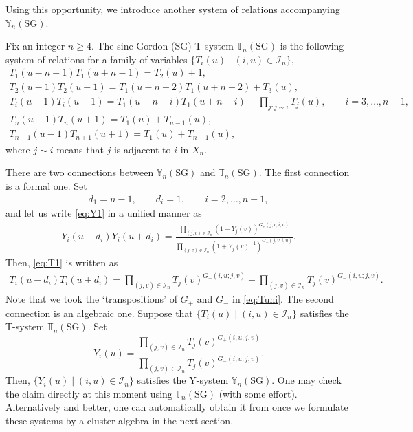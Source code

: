 Using this opportunity, we introduce
another system of relations
 accompanying  $\mathbb{Y}_{n}(\mathrm{SG})$.
\begin{Definition}
Fix an integer $n \geq 4$.
The sine-Gordon (SG)
T-system $\mathbb{T}_{n}(\mathrm{SG})$
is the following system of relations for
a family of variables
 $\{T_i(u) \mid (i,u)\in \mathcal{I}_n \}$,
\begin{gather}
T_1\left(u-n+1\right)
T_1\left(u+n-1\right)
=
T_2(u)+1,\nonumber\\
T_2(u-1) T_2(u+1)
=
T_1(u-n+2)T_1(u+n-2)+T_3(u),
\nonumber\\
T_i(u-1)T_i(u+1)
=
T_1(u-n+i)T_1(u+n-i)
+ \prod_{j:j\sim i} T_j(u),
\qquad i=3,\dots,n-1,
\nonumber\\
T_{n}(u-1)T_{n}(u+1)
=
T_1(u) + T_{n-1}(u),
\nonumber\\
T_{n+1}(u-1)T_{n+1}(u+1)
=
T_1(u) + T_{n-1}(u),\label{eq:T1}
\end{gather}
where $j\sim i$ means that $j$ is adjacent to $i$ in $X_n$.
\end{Definition}

There are two connections between
$\mathbb{Y}_{n}(\mathrm{SG})$ and $\mathbb{T}_{n}(\mathrm{SG})$.
The f\/irst connection is a formal one.
Set
\begin{gather}
\label{eq:di}
d_1=n-1, \qquad d_i=1,\qquad i=2,\dots,n-1,
\end{gather}
and let us  write \eqref{eq:Y1}
in a unif\/ied manner as
\begin{gather}
\label{eq:Yuni}
Y_i\left(u-d_i\right)
Y_i\left(u+d_i\right)
=
\frac{
{\prod\limits_{(j,v)\in \mathcal{I}_{n}}
(1+Y_j(v))^{G_+(j,v;i,u)}
}
}
{\prod\limits_{(j,v)\in \mathcal{I}_{n}}
(1+Y_j(v)^{-1})^{G_-(j,v;i,u)}
}.
\end{gather}
Then, \eqref{eq:T1} is written as
\begin{gather}
\label{eq:Tuni}
T_i\left(u-d_i\right)
T_i\left(u+d_i\right)
=
\prod_{(j,v)\in \mathcal{I}_{n}}
T_j(v)^{G_+(i,u;j,v)}
+
\prod_{(j,v)\in \mathcal{I}_{n}}
T_j(v)^{G_-(i,u;j,v)}.
\end{gather}
Note that we took the `transpositions'
of $G_+$ and $G_-$ in \eqref{eq:Tuni}.
The second connection is an algebraic one.
Suppose that $\{ T_i(u) \mid (i,u)
\in \mathcal{I}_n\}$ satisf\/ies
the T-system $\mathbb{T}_n(\mathrm{SG})$.
Set
\[
Y_i(u)
=
\frac{\prod\limits_{(j,v)\in \mathcal{I}_{n}}
T_j(v)^{G_+(i,u;j,v)}
}
{\prod\limits_{(j,v)\in \mathcal{I}_{n}}
T_j(v)^{G_-(i,u;j,v)}}.
\]
Then, $\{ Y_i(u) \mid (i,u)
\in \mathcal{I}_n\}$ satisf\/ies
the Y-system $\mathbb{Y}_n(\mathrm{SG})$.
One may check the claim directly at this moment
using $\mathbb{T}_n(\mathrm{SG})$
(with some ef\/fort).
Alternatively and better, one can automatically obtain  it from
 \cite[Proposition 3.9]{Fomin07}
once we formulate these systems by a cluster algebra
in the next section.

